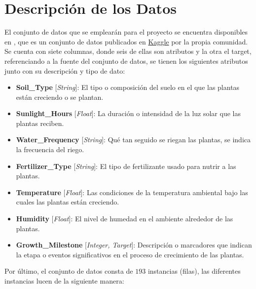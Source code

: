 \documentclass[12pt,a4paper]{article}
\begin{document}
    \section{Descripción de los Datos}
    {
        El conjunto de datos que se emplearán para el proyecto se encuentra disponibles 
        en \cite{dataset_plants}, que es un conjunto de datos publicados en \href{https://www.kaggle.com/}{Kaggle} por 
        la propia comunidad. Se cuenta con siete columnas, donde seis de ellas son 
        atributos y la otra el target, referenciando a la fuente del conjunto de datos, 
        se tienen los siguientes atributos junto con su descripción y tipo de dato: 

        \begin{itemize}
            \item \textbf{Soil\_Type       } [\emph{String}]: El tipo o composición del suelo 
            en el que las plantas están creciendo o se plantan.
            
            \item \textbf{Sunlight\_Hours  } [\emph{Float}]: La duración o intensidad de la luz 
            solar que las plantas reciben.
            
            \item \textbf{Water\_Frequency } [\emph{String}]: Qué tan seguido se riegan las 
            plantas, se indica la frecuencia del riego.
            
            \item \textbf{Fertilizer\_Type } [\emph{String}]: El tipo de fertilizante usado 
            para nutrir a las plantas.
            
            \item \textbf{Temperature      } [\emph{Float}]: Las condiciones de la temperatura 
            ambiental bajo las cuales las plantas están creciendo.

            \item \textbf{Humidity         } [\emph{Float}]: El nivel de humedad en el ambiente 
            alrededor de las plantas.

            \item \textbf{Growth\_Milestone} [\emph{Integer, Target}]: Descripción o marcadores 
            que indican la etapa o eventos significativos en el proceso de crecimiento de 
            las plantas.
        \end{itemize}

        Por último, el conjunto de datos consta de $193$ instancias (filas), las diferentes 
        instancias lucen de la siguiente manera:

}
\end{document}

